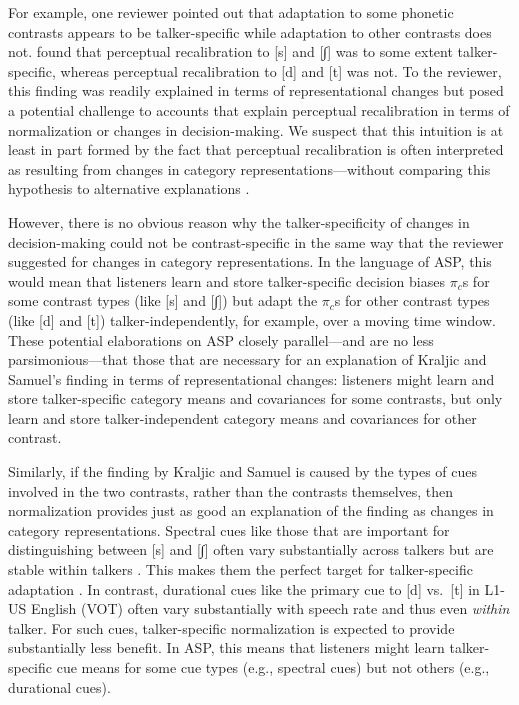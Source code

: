 \documentclass[
  11pt,
  man,floatsintext]{apa6}
\begin{document}
For example, one reviewer pointed out that adaptation to some phonetic contrasts appears to be talker-specific while adaptation to other contrasts does not. \textcite{kraljic-samuel2007} found that perceptual recalibration to {[}s{]} and {[}∫{]} was to some extent talker-specific, whereas perceptual recalibration to {[}d{]} and {[}t{]} was not. To the reviewer, this finding was readily explained in terms of representational changes but posed a potential challenge to accounts that explain perceptual recalibration in terms of normalization or changes in decision-making. We suspect that this intuition is at least in part formed by the fact that perceptual recalibration is often interpreted as resulting from changes in category representations---without comparing this hypothesis to alternative explanations \autocite[for related discussion, see also][]{zheng-samuel2020}.

However, there is no obvious reason why the talker-specificity of changes in decision-making could not be contrast-specific in the same way that the reviewer suggested for changes in category representations. In the language of ASP, this would mean that listeners learn and store talker-specific decision biases \(\pi_c\)s for some contrast types (like {[}s{]} and {[}∫{]}) but adapt the \(\pi_c\)s for other contrast types (like {[}d{]} and {[}t{]}) talker-independently, for example, over a moving time window. These potential elaborations on ASP closely parallel---and are no less parsimonious---that those that are necessary for an explanation of Kraljic and Samuel's finding in terms of representational changes: listeners might learn and store talker-specific category means and covariances for some contrasts, but only learn and store talker-independent category means and covariances for other contrast.

Similarly, if the finding by Kraljic and Samuel is caused by the types of cues involved in the two contrasts, rather than the contrasts themselves, then normalization provides just as good an explanation of the finding as changes in category representations. Spectral cues like those that are important for distinguishing between {[}s{]} and {[}∫{]} often vary substantially across talkers but are stable within talkers \autocite[e.g.,][]{heald-nusbaum2015}. This makes them the perfect target for talker-specific adaptation \autocite[see][]{kleinschmidt-jaeger2015}. In contrast, durational cues like the primary cue to {[}d{]} vs.~{[}t{]} in L1-US English (VOT) often vary substantially with speech rate and thus even \emph{within} talker. For such cues, talker-specific normalization is expected to provide substantially less benefit. In ASP, this means that listeners might learn talker-specific cue means for some cue types (e.g., spectral cues) but not others (e.g., durational cues).
\end{document}
